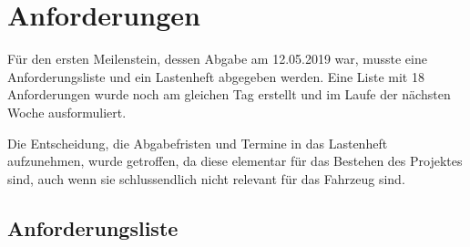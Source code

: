 \chapter{Anforderungen}
Für den ersten Meilenstein, dessen Abgabe am 12.05.2019 war, musste eine Anforderungsliste und ein Lastenheft abgegeben werden. Eine Liste mit 18 Anforderungen wurde noch am gleichen Tag erstellt und im Laufe der nächsten Woche ausformuliert.

Die Entscheidung, die Abgabefristen und Termine in das Lastenheft aufzunehmen, wurde getroffen, da diese elementar für das Bestehen des Projektes sind, auch wenn sie schlussendlich nicht relevant für das Fahrzeug sind. 

\section{Anforderungsliste}
